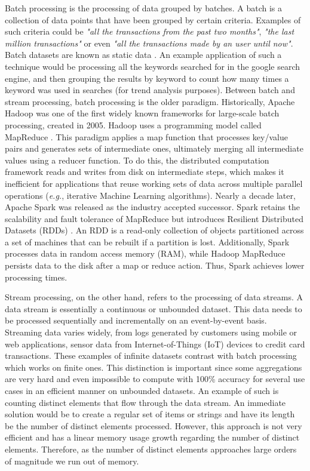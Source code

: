 Batch processing is the processing of data grouped by batches. A batch is a collection of data points that have been grouped by certain criteria. Examples of such criteria could be \textit{"all the transactions from the past two months"}, \textit{"the last million transactions"} or even \textit{"all the transactions made by an user until now"}. Batch datasets are known as static data \cite{Martin-Batch-Defin}. An example application of such a technique would be processing all the keywords searched for in the google search engine, and then grouping the results by keyword to count how many times a keyword was used in searches (for trend analysis purposes). Between batch and stream processing, batch processing is the older paradigm. Historically, Apache Hadoop \cite{borthakur2007hadoop, Hadoop, ApacheHadoop} was one of the first widely known frameworks for large-scale batch processing, created in 2005. Hadoop uses a programming model called MapReduce \cite{MapReduce}. This paradigm applies a map function that processes key/value pairs and generates sets of intermediate ones, ultimately merging all intermediate values
using a reducer function. To do this, the distributed computation framework reads and writes from disk on intermediate steps, which makes it inefficient for applications that reuse working sets of data across multiple parallel operations (\textit{e.g.}, iterative Machine Learning algorithms). Nearly a decade later, Apache Spark \cite{ApacheSpark, Spark} was released as the industry accepted successor.
Spark retains the scalability and fault tolerance of MapReduce but introduces Resilient Distributed Datasets (RDDs) \cite{SparkRDDs}. An RDD is a read-only collection of objects partitioned across a set of machines that can be rebuilt if a partition is lost.
Additionally, Spark processes data in random access memory (RAM), while Hadoop MapReduce persists data to the disk after a map or reduce action. Thus, Spark achieves lower processing times. 

Stream processing, on the other hand, refers to the processing of data streams. A data stream is essentially a continuous or unbounded dataset. This data needs to be processed sequentially and incrementally on an event-by-event basis. Streaming data varies widely, from logs generated by customers using mobile or web applications, sensor data from Internet-of-Things (IoT) devices to credit card transactions. These examples of infinite datasets contrast with batch processing which works on finite ones. This distinction is important since some aggregations are very hard and even impossible to compute with 100\% accuracy for several use cases in an efficient manner on unbounded datasets. An example of such is counting distinct elements that flow through the data stream. An immediate solution would be to create a regular set of items or strings and have its length be the number of distinct elements processed. However, this approach is not very efficient and has a linear memory usage growth regarding the number of distinct elements. Therefore, as the number of distinct elements approaches large orders of magnitude we run out of memory.

